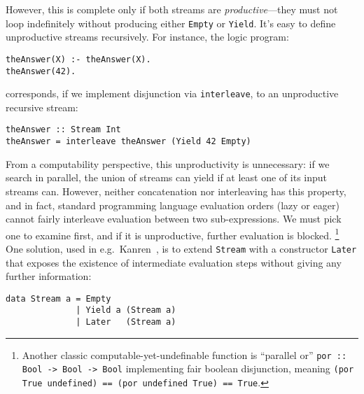 \documentclass[acmsmall,screen,review,anonymous,dvipsnames,svgnames]{acmart}
\newcommand\hask[1]{\texttt{#1}}
\newcommand\ttt\texttt
\begin{document}
\noindent
However, this is complete only if both streams are \emph{productive}---they must not loop indefinitely without producing either \hask{Empty} or \hask{Yield}.
It's easy to define unproductive streams recursively.
For instance, the logic program:

\begin{verbatim}
theAnswer(X) :- theAnswer(X).
theAnswer(42).
\end{verbatim}

\noindent
corresponds, if we implement disjunction via \ttt{interleave}, to an unproductive recursive stream:

\begin{verbatim}
theAnswer :: Stream Int
theAnswer = interleave theAnswer (Yield 42 Empty)
\end{verbatim}


\noindent
From a computability perspective, this unproductivity is unnecessary: if we search in parallel, the union of streams can yield if at least one of its input streams can.
However, neither concatenation nor interleaving has this property, and in fact, standard programming language evaluation orders (lazy or eager) cannot fairly interleave evaluation between two sub-expressions.
We must pick one to examine first, and if it is unproductive, further evaluation is blocked.%
\footnote{Another classic computable-yet-undefinable function is ``parallel or'' \hask{por :: Bool -> Bool -> Bool} implementing fair boolean disjunction, meaning \hask{(por True undefined) == (por undefined True) == True}.}
%
One solution, used in e.g.\ \textmu{}Kanren~\citep{muKanren}, is to extend \hask{Stream} with a constructor \hask{Later} that exposes the existence of intermediate evaluation steps without giving any further information:\footnotemark


\begin{verbatim}
data Stream a = Empty
              | Yield a (Stream a)
              | Later   (Stream a)
\end{verbatim}
\end{document}

